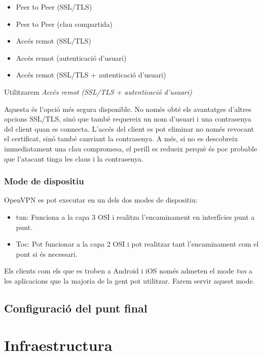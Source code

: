 \documentclass[
  10pt,
]{krantz}
\providecommand{\tightlist}{%
  \setlength{\itemsep}{0pt}\setlength{\parskip}{0pt}}
\begin{document}
\begin{itemize}
\tightlist
\item
  Peer to Peer (SSL/TLS)
\item
  Peer to Peer (clau compartida)
\item
  Accés remot (SSL/TLS)
\item
  Accés remot (autenticació d'usuari)
\item
  Accés remot (SSL/TLS + autenticació d'usuari)
\end{itemize}

Utilitzarem \emph{Accés remot (SSL/TLS + autenticació d'usuari)}

Aquesta és l'opció més segura disponible. No només obté els avantatges d'altres opcions SSL/TLS, sinó que també requereix un nom d'usuari i una contrasenya del client quan es connecta. L'accés del client es pot eliminar no només revocant el certificat, sinó també canviant la contrasenya. A més, si no es descobreix immediatament una clau compromesa, el perill es redueix perquè és poc probable que l'atacant tinga les claus i la contrasenya.

\hypertarget{mode-de-dispositiu}{%
\subsection{Mode de dispositiu}\label{mode-de-dispositiu}}

OpenVPN es pot executar en un dels dos modes de dispositiu:

\begin{itemize}
\item
  tun: Funciona a la capa 3 OSI i realitza l'encaminament en interfícies punt a punt.
\item
  Toc: Pot funcionar a la capa 2 OSI i pot realitzar tant l'encaminament com el pont si és necessari.
\end{itemize}

Els clients com els que es troben a Android i iOS només admeten el mode \emph{tun} a les aplicacions que la majoria de la gent pot utilitzar. Farem servir aquest mode.

\hypertarget{configuraciuxf3-del-punt-final}{%
\section{Configuració del punt final}\label{configuraciuxf3-del-punt-final}}

\hypertarget{infraestructura}{%
\chapter{Infraestructura}\label{infraestructura}}
\end{document}

